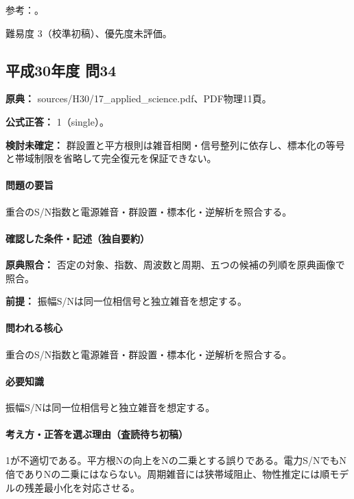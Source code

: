 \par 参考：\cite{mit_signals2010,mit_moving2012,scipy_notch,scipy_fft,usgs_processing2000,scipy_coherence}。

\par 難易度 3（校準初稿）、優先度未評価。

\subsection{平成30年度 問34}
\label{q:h30-reg-applied-34}

\noindent\textbf{原典：} sources/H30/17\_applied\_science.pdf、PDF物理11頁。

\textbf{公式正答：} 1（single）。

\par\textbf{検討未確定：} 群設置と平方根則は雑音相関・信号整列に依存し、標本化の等号と帯域制限を省略して完全復元を保証できない。

\paragraph{問題の要旨} 重合のS/N指数と電源雑音・群設置・標本化・逆解析を照合する。

\paragraph{確認した条件・記述（独自要約）}\mbox{}\par

\noindent\textbf{原典照合：} 否定の対象、指数、周波数と周期、五つの候補の列順を原典画像で照合。\par

\noindent\textbf{前提：} 振幅S/Nは同一位相信号と独立雑音を想定する。\par

\paragraph{問われる核心} 重合のS/N指数と電源雑音・群設置・標本化・逆解析を照合する。

\paragraph{必要知識} 振幅S/Nは同一位相信号と独立雑音を想定する。

\paragraph{考え方・正答を選ぶ理由（査読待ち初稿）} 1が不適切である。平方根Nの向上をNの二乗とする誤りである。電力S/NでもN倍でありNの二乗にはならない。周期雑音には狭帯域阻止、物性推定には順モデルの残差最小化を対応させる。

